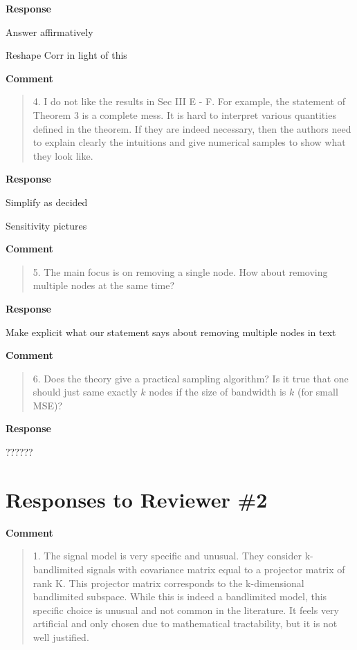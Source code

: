 \documentclass[11pt,onecolumn,journal]{IEEEtran}
\begin{document}
\textbf{Response}
\begin{todolist}
    \item Answer affirmatively
    \item Reshape Corr in light of this
\end{todolist}
\textbf{Comment}
\begin{quote}
4. I do not like the results in Sec III E - F. For example, the statement of Theorem 3 is a complete mess. It is hard to interpret various quantities defined in the theorem. If they are indeed necessary, then the authors need to explain clearly the intuitions and give numerical samples to show what they look like.
\end{quote}

\textbf{Response}
\begin{todolist}
    \item Simplify as decided
    \item Sensitivity pictures
\end{todolist}

\textbf{Comment}
\begin{quote}
5. The main focus is on removing a single node. How about removing multiple nodes at the same time?
\end{quote}

\textbf{Response}
\begin{todolist}
    \item Make explicit what our statement says about removing multiple nodes in text
\end{todolist}


\textbf{Comment}
\begin{quote}
6. Does the theory give a practical sampling algorithm? Is it true that one should just same exactly $k$ nodes if the size of bandwidth is $k$ (for small MSE)?
\end{quote}

\textbf{Response}
\begin{todolist}
    \item ??????
\end{todolist}

\section*{Responses to Reviewer \#2}
\textbf{Comment}
\begin{quote}
1. The signal model is very specific and unusual. They consider k-bandlimited signals with covariance matrix equal to a projector matrix of rank K. This projector matrix corresponds to the k-dimensional bandlimited subspace. While this is indeed a bandlimited model, this specific choice is unusual and not common in the literature. It feels very artificial and only chosen due to mathematical tractability, but it is not well justified.  
\end{quote}
\end{document}
